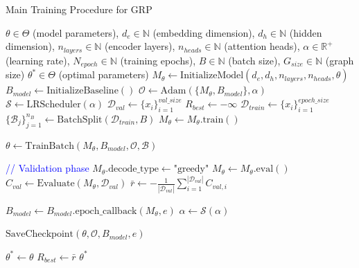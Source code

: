 \documentclass[AutoFakeBold]{LZUThesis}
\begin{document}


\begin{algorithm}[h]
	\begin{algorithmic}[1]
		\caption{Main Training Procedure for GRP}
		\label{alg:grp_main_training}
		\Require $\theta \in \Theta$ (model parameters), $d_e \in \mathbb{N}$ (embedding dimension), $d_h \in \mathbb{N}$ (hidden dimension), $n_{layers} \in \mathbb{N}$ (encoder layers), $n_{heads} \in \mathbb{N}$ (attention heads), $\alpha \in \mathbb{R}^{+}$ (learning rate), $N_{epoch} \in \mathbb{N}$ (training epochs), $B \in \mathbb{N}$ (batch size), $G_{size} \in \mathbb{N}$ (graph size)
		\Ensure $\theta^* \in \Theta$ (optimal parameters)
		\State $M_{\theta} \leftarrow \text{InitializeModel}(d_e, d_h, n_{layers}, n_{heads}, \theta)$
		\State $B_{model} \leftarrow \text{InitializeBaseline}()$
		\State $\mathcal{O} \leftarrow \text{Adam}(\{M_{\theta}, B_{model}\}, \alpha)$
		\State $\mathcal{S} \leftarrow \text{LRScheduler}(\alpha)$
		\State $\mathcal{D}_{val} \leftarrow \{x_i\}_{i=1}^{val\_size}$ 
		\State $R_{best} \leftarrow -\infty$ 
		\State $\mathcal{D}_{train} \leftarrow \{x_i\}_{i=1}^{epoch\_size}$ 
		\State $\{\mathcal{B}_j\}_{j=1}^{n_B} \leftarrow \text{BatchSplit}(\mathcal{D}_{train}, B)$
		\State $M_{\theta} \leftarrow M_{\theta}.\text{train}()$ 

		\State $\theta \leftarrow \text{TrainBatch}(M_{\theta}, B_{model}, \mathcal{O}, \mathcal{B})$ 
		\EndFor

		\State \textcolor{blue}{// Validation phase}
		\State $M_{\theta}.\text{decode\_type} \leftarrow \text{"greedy"}$
		\State $M_{\theta} \leftarrow M_{\theta}.\text{eval}()$
		\State $C_{val} \leftarrow \text{Evaluate}(M_{\theta}, \mathcal{D}_{val})$
		\State $\bar{r} \leftarrow -\frac{1}{|\mathcal{D}_{val}|}\sum_{i=1}^{|\mathcal{D}_{val}|} C_{val,i}$ 

		\State $B_{model} \leftarrow B_{model}.\text{epoch\_callback}(M_{\theta}, e)$
		\State $\alpha \leftarrow \mathcal{S}(\alpha)$ 

		\State $\text{SaveCheckpoint}(\theta, \mathcal{O}, B_{model}, e)$
		\EndIf

		\State $\theta^* \leftarrow \theta$ 
		\State $R_{best} \leftarrow \bar{r}$
		\EndIf
		\EndFor
		\State \Return $\theta^*$
	\end{algorithmic}
\end{algorithm}
\end{document}
